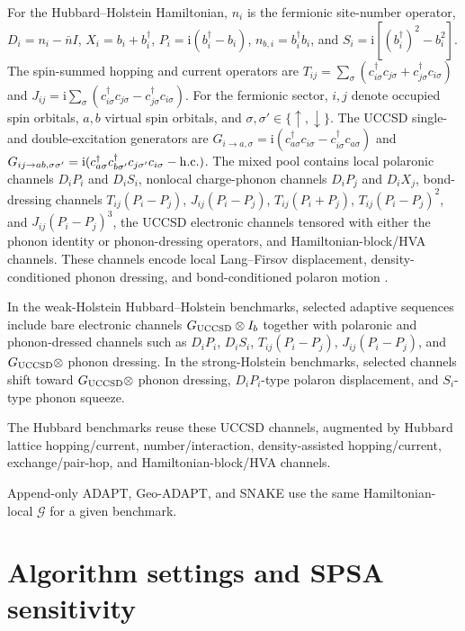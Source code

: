 \documentclass[
  reprint,
  amsmath,
  amssymb,
  aps,
  pra,
  nofootinbib,
  superscriptaddress,
  floatfix
]{revtex4-2}
\newcommand{\Gset}{\mathcal{G}}
\newcommand{\ii}{\mathrm{i}}
\begin{document}
For the Hubbard--Holstein Hamiltonian, \(n_i\) is the fermionic site-number
operator, \(D_i=n_i-\bar n I\), \(X_i=b_i+b_i^\dagger\),
\(P_i=\ii(b_i^\dagger-b_i)\), \(n_{b,i}=b_i^\dagger b_i\), and
\(S_i=\ii[(b_i^\dagger)^2-b_i^2]\).  The spin-summed hopping and current
operators are \(T_{ij}=\sum_\sigma(c_{i\sigma}^\dagger c_{j\sigma}
+c_{j\sigma}^\dagger c_{i\sigma})\) and
\(J_{ij}=\ii\sum_\sigma(c_{i\sigma}^\dagger c_{j\sigma}
-c_{j\sigma}^\dagger c_{i\sigma})\).  For the fermionic sector, \(i,j\)
denote occupied spin orbitals, \(a,b\) virtual spin orbitals, and
\(\sigma,\sigma'\in\{\uparrow,\downarrow\}\).  The UCCSD single- and
double-excitation generators are
\(G_{i\to a,\sigma}=\ii(c_{a\sigma}^{\dagger}c_{i\sigma}
-c_{i\sigma}^{\dagger}c_{a\sigma})\) and
\(G_{ij\to ab,\sigma\sigma'}=\ii(c_{a\sigma}^{\dagger}
c_{b\sigma'}^{\dagger}c_{j\sigma'}c_{i\sigma}-{\rm h.c.})\).  The mixed pool contains local
polaronic channels \(D_iP_i\) and \(D_iS_i\), nonlocal charge-phonon channels
\(D_iP_j\) and \(D_iX_j\), bond-dressing channels \(T_{ij}(P_i-P_j)\),
\(J_{ij}(P_i-P_j)\), \(T_{ij}(P_i+P_j)\), \(T_{ij}(P_i-P_j)^2\), and
\(J_{ij}(P_i-P_j)^3\), the UCCSD electronic channels tensored with either the phonon identity
or phonon-dressing operators, and Hamiltonian-block/HVA channels.  These
channels encode local Lang--Firsov displacement, density-conditioned phonon
dressing, and bond-conditioned polaron motion
\cite{Holstein1959a,Holstein1959b,Sakkinen2015HolsteinDimer}.

In the weak-Holstein Hubbard--Holstein benchmarks, selected adaptive sequences
include bare electronic channels \(G_{\rm UCCSD}\otimes I_b\) together with
polaronic and phonon-dressed channels such as \(D_iP_i\), \(D_iS_i\),
\(T_{ij}(P_i-P_j)\), \(J_{ij}(P_i-P_j)\), and
\(G_{\rm UCCSD}\otimes\) phonon dressing.  In the strong-Holstein benchmarks,
selected channels shift toward \(G_{\rm UCCSD}\otimes\) phonon dressing,
\(D_iP_i\)-type polaron displacement, and \(S_i\)-type phonon squeeze.

The Hubbard benchmarks reuse these UCCSD channels, augmented by Hubbard
lattice hopping/current, number/interaction, density-assisted hopping/current,
exchange/pair-hop, and Hamiltonian-block/HVA channels.

Append-only ADAPT, Geo-ADAPT, and SNAKE use the same Hamiltonian-local
\(\Gset\) for a given benchmark.

\section{Algorithm settings and SPSA sensitivity}
\label{app:results_discussion}
\end{document}
